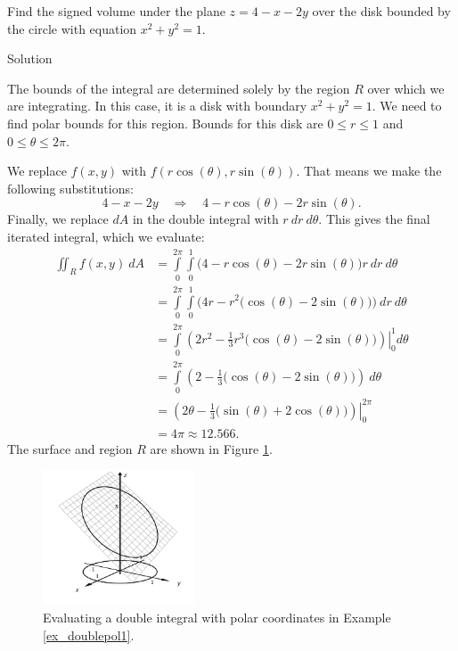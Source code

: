 \begin{example}\label{ex_doublepol1}
Find the signed volume under the plane $z= 4-x-2y$ over the disk bounded by the circle with equation $x^2+y^2=1$.

Solution 

The bounds of the integral are determined solely by the region $R$ over which we are integrating. In this case, it is a disk with boundary $x^2+y^2=1$. We need to find polar bounds for this region. Bounds for this disk are $0\leq r\leq 1$ and $0\leq \theta\leq 2\pi$.

We replace $f(x,y)$ with $f\left(r\cos(\theta),r\sin(\theta)\right)$. That means we make the following substitutions:
$$4-x-2y \quad \Rightarrow \quad 4-r\cos(\theta)-2r\sin(\theta).$$
Finally, we replace $dA$ in the double integral with $r\ dr\ d\theta$. This gives the final iterated integral, which we evaluate:
\allowdisplaybreaks
\begin{align*}
\iint_Rf(x,y)\ dA &= \int\limits_0^{2\pi}\int\limits_0^1\big(4-r\cos(\theta)-2r\sin(\theta)\big)r\ dr\ d\theta\\
						&= \int\limits_0^{2\pi}\int\limits_0^1\Big(4r-r^2\big(\cos(\theta)-2\sin(\theta)\big)\Big)\ dr\ d\theta\\
						&= \int\limits_0^{2\pi}\left.\left(2r^2-\frac13r^3\big(\cos(\theta)-2\sin(\theta)\big)\right)\right|_0^1d\theta\\
						&= \int\limits_0^{2\pi} \left(2-\frac13\big(\cos(\theta)-2\sin(\theta)\big)\right)\ d\theta\\
						&= \left.\left(2\theta -\frac13\big(\sin(\theta)+2\cos(\theta)\big)\right)\right|_0^{2\pi} \\
						&= 4\pi \approx 12.566.
\end{align*}
The surface and region $R$ are shown in Figure \ref{fig_double_13}.

\begin{figure}[H]
	\begin{center}
			\includegraphics[width=0.4\textwidth]{fig_double_13}
	\caption{Evaluating a double integral with polar coordinates in Example \ref{ex_doublepol1}.}
	\label{fig_double_13}
	\end{center}
\end{figure}

\end{example}

